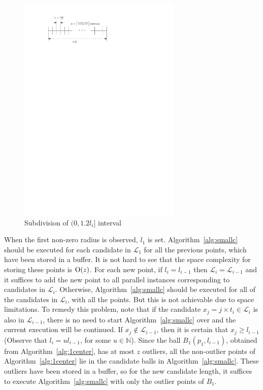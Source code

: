 \documentclass[envcountsame]{cls/cccg15}
\newcommand{\cO}{\ensuremath{{\rm O}}}
\newcommand{\gee}{\geqslant}
\renewcommand{\ge}{\gee}
\begin{document}
\begin{figure}[h]
	\centering
	\includegraphics[width=21em]{figs/findr}
	\caption{Subdivision of $(0, 1.2 l_i]$ interval}
	\label{fig:findr}
\end{figure}

When the first non-zero radius is observed, $l_1$ is set. Algorithm~\ref{alg:smallc} should be executed for each candidate in $\mathcal{L}_1$ for all the previous points, which have been stored in a buffer. It is not hard to see that the space complexity for storing these points is $\cO(z)$. For each new point, if $l_i=l_{i-1}$ then $\mathcal{L}_i = \mathcal{L}_{i-1}$ and it suffices to add the new point to all parallel instances corresponding to candidates in $\mathcal{L}_i$. Otherwise, Algorithm~\ref{alg:smallc} should be executed for all of the candidates in $\mathcal{L}_i$, with all the points. But this is not achievable due to space limitations. To remedy
this problem, note that if the candidate $x_j=j \times t_i \in \mathcal{L}_i$ is also in $\mathcal{L}_{i-1}$, there is no need to start Algorithm~\ref{alg:smallc} over and the current execution will be continued. If $x_j \notin \mathcal{L}_{i-1}$, then it is certain that $x_j \ge l_{i - 1}$ (Observe that $l_i=ul_{i-1}$, for some $u\in \mathbb{N}$). Since the ball $B_1(p_1, l_{i-1})$, obtained from Algorithm~\ref{alg:1center}, has at most $z$ outliers, all the non-outlier points of Algorithm~\ref{alg:1center}  lie in the candidate balls in Algorithm~\ref{alg:smallc}.
These outliers have been stored in a buffer, so for the new candidate length, it suffices to execute Algorithm~\ref{alg:smallc} with only the outlier points of $B_1$.
\end{document}
